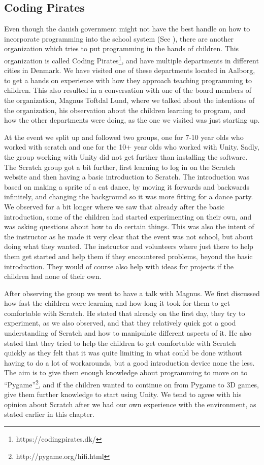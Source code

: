 \subsection{Coding Pirates}
\label{sec:coding_pirates}
Even though the danish government might not have the best handle on how to incorporate programming into the school system (See ), there are another organization which tries to put programming in the hands of children. This organization is called Coding Pirates\footnote{https://codingpirates.dk/}, and have multiple departments in different cities in Denmark. We have visited one of these departments located in Aalborg, to get a hands on experience with how they approach teaching programming to children. This also resulted in a conversation with one of the board members of the organization, Magnus Toftdal Lund, where we talked about the intentions of the organization, his observation about the children learning to program, and how the other departments were doing, as the one we visited was just starting up.

At the event we split up and followed two groups, one for 7-10 year olds who worked with scratch and one for the 10+ year olds who worked with Unity. Sadly, the group working with Unity did not get further than installing the software. The Scratch group got a bit further, first learning to log in on the Scratch website and then having a basic introduction to Scratch. The introduction was based on making a sprite of a cat dance, by moving it forwards and backwards infinitely, and changing the background so it was more fitting for a dance party. We observed for a bit longer where we saw that already after the basic introduction, some of the children had started experimenting on their own, and was asking questions about how to do certain things. This was also the intent of the instructor as he made it very clear that the event was not school, but about doing what they wanted. The instructor and volunteers where just there to help them get started and help them if they encountered problems, beyond the basic introduction. They would of course also help with ideas for projects if the children had none of their own.

After observing the group we went to have a talk with Magnus. We first discussed how fast the children were learning and how long it took for them to get comfortable with Scratch. He stated that already on the first day, they try to experiment, as we also observed, and that they relatively quick got a good understanding of Scratch and how to manipulate different aspects of it. He also stated that they tried to help the children to get comfortable with Scratch quickly as they felt that it was quite limiting in what could be done without having to do a lot of workarounds, but a good introduction device none the less. The aim is to give them enough knowledge about programming to move on to ``Pygame''\footnote{http://pygame.org/hifi.html}, and if the children wanted to continue on from Pygame to 3D games, give them further knowledge to start using Unity. We tend to agree with his opinion about Scratch after we had our own experience with the environment, as stated earlier in this chapter.

